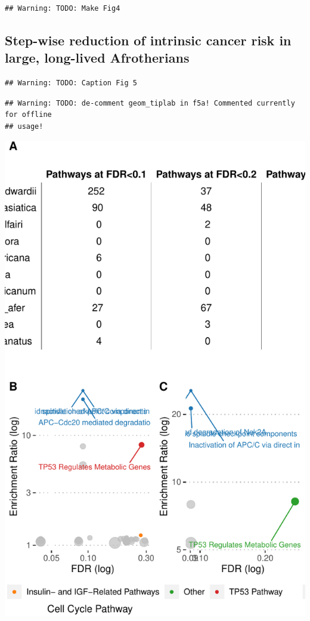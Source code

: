 \documentclass[10pt,letterpaper]{article}
\begin{document}
\begin{verbatim}
## Warning: TODO: Make Fig4
\end{verbatim}

\hypertarget{step-wise-reduction-of-intrinsic-cancer-risk-in-large-long-lived-afrotherians}{%
\subsection{Step-wise reduction of intrinsic cancer risk in large,
long-lived
Afrotherians}\label{step-wise-reduction-of-intrinsic-cancer-risk-in-large-long-lived-afrotherians}}

\begin{verbatim}
## Warning: TODO: Caption Fig 5
\end{verbatim}

\begin{verbatim}
## Warning: TODO: de-comment geom_tiplab in f5a! Commented currently for offline
## usage!
\end{verbatim}

\includegraphics{paper_PLOS_draft_files/figure-latex/Fig 5-1.pdf}
\end{document}
